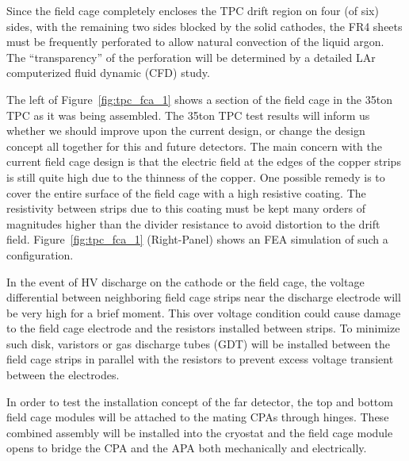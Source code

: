 Since the field cage completely encloses the TPC drift region on four (of six) sides, with the remaining two sides blocked by the solid cathodes, the FR4 sheets must  be frequently perforated to allow natural convection of the liquid argon.  The ``transparency'' of the perforation will be determined by a detailed LAr computerized fluid dynamic (CFD) study.

The left of Figure~\ref{fig:tpc_fca_1} shows a section of the field cage in the 35ton TPC as it was being assembled.  The 35ton TPC test results will inform us whether we should improve upon the current design, or change the design concept all together for this and future detectors.  The main concern with the current field cage design is that the electric field at the edges of the copper strips is still quite high due to the thinness of the copper.  One possible remedy is to cover the entire surface of the field cage with a high resistive coating.  The resistivity between strips due to this coating must be kept many orders of magnitudes higher than the divider resistance to avoid distortion to the drift field.  Figure~\ref{fig:tpc_fca_1} (Right-Panel) shows an FEA simulation of such a configuration.

In the event of HV discharge on the cathode or the field cage, the voltage differential between neighboring field cage strips near the discharge electrode will be very high for a brief moment.  This over voltage condition could cause damage to the field cage electrode and the resistors installed between strips.  To minimize such disk, varistors or gas discharge tubes (GDT) will be installed between the field cage strips in parallel with the resistors to prevent excess voltage transient between the electrodes. 

In order to test the installation concept of the far detector, the top and bottom field cage modules will be attached to the mating CPAs through hinges.  These combined assembly will be installed into the cryostat and the field cage module opens to bridge the CPA and the APA both mechanically and electrically. 






